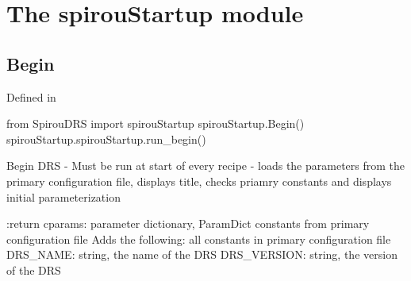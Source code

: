 
\clearpage
\newpage
\begin{minipage}{\textwidth}
\section{The spirouStartup module}
\label{ch:the_module:spirouStartup}

\subsection{Begin}

Defined in \spirouStartup{}

\begin{pythonbox}
from SpirouDRS import spirouStartup
spirouStartup.Begin()
spirouStartup.spirouStartup.run_begin()
\end{pythonbox}

\begin{pythondocstring}
Begin DRS - Must be run at start of every recipe
- loads the parameters from the primary configuration file, displays
  title, checks priamry constants and displays initial parameterization

:return cparams: parameter dictionary, ParamDict constants from primary
                 configuration file
        Adds the following:
            all constants in primary configuration file
            DRS_NAME: string, the name of the DRS
            DRS_VERSION: string, the version of the DRS
\end{pythondocstring}
\end{minipage}

